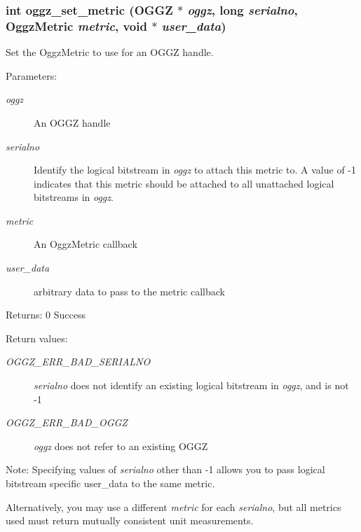 \subsubsection{\setlength{\rightskip}{0pt plus 5cm}int oggz\_\-set\_\-metric ({\bf OGGZ} $\ast$ {\em oggz}, long {\em serialno}, {\bf Oggz\-Metric} {\em metric}, void $\ast$ {\em user\_\-data})}\label{group__seek__api_ga2}


Set the Oggz\-Metric to use for an OGGZ handle. 

\begin{Desc}
\item[Parameters:]
\begin{description}
\item[{\em oggz}]An OGGZ handle \item[{\em serialno}]Identify the logical bitstream in {\em oggz\/} to attach this metric to. A value of -1 indicates that this metric should be attached to all unattached logical bitstreams in {\em oggz\/}. \item[{\em metric}]An Oggz\-Metric callback \item[{\em user\_\-data}]arbitrary data to pass to the metric callback\end{description}
\end{Desc}
\begin{Desc}
\item[Returns:]0 Success \end{Desc}
\begin{Desc}
\item[Return values:]
\begin{description}
\item[{\em OGGZ\_\-ERR\_\-BAD\_\-SERIALNO}]{\em serialno\/} does not identify an existing logical bitstream in {\em oggz\/}, and is not -1 \item[{\em OGGZ\_\-ERR\_\-BAD\_\-OGGZ}]{\em oggz\/} does not refer to an existing OGGZ\end{description}
\end{Desc}
\begin{Desc}
\item[Note:]Specifying values of {\em serialno\/} other than -1 allows you to pass logical bitstream specific user\_\-data to the same metric. 

Alternatively, you may use a different {\em metric\/} for each {\em serialno\/}, but all metrics used must return mutually consistent unit measurements. \end{Desc}
